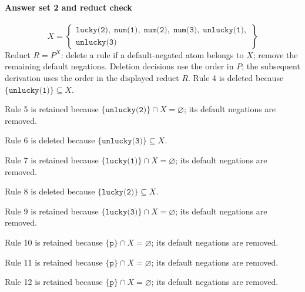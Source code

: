 \documentclass[a4paper,11pt]{article}
\newcommand{\at}[1]{\texttt{#1}}
\begin{document}
\paragraph{Answer set 2 and reduct check}
\[
X=\left\{\begin{gathered}\at{lucky(2)},\;\at{num(1)},\;\at{num(2)},\;\at{num(3)},\;\at{unlucky(1)},\\\at{unlucky(3)}\end{gathered}\right\}
\]
Reduct $R=P^X$: delete a rule if a default-negated atom belongs to $X$; remove the remaining default negations. Deletion decisions use the order in $P$; the subsequent derivation uses the order in the displayed reduct $R$.
Rule 4 is deleted because $\{\at{unlucky(1)}\}\subseteq X$.

Rule 5 is retained because $\{\at{unlucky(2)}\}\cap X=\varnothing$; its default negations are removed.

Rule 6 is deleted because $\{\at{unlucky(3)}\}\subseteq X$.

Rule 7 is retained because $\{\at{lucky(1)}\}\cap X=\varnothing$; its default negations are removed.

Rule 8 is deleted because $\{\at{lucky(2)}\}\subseteq X$.

Rule 9 is retained because $\{\at{lucky(3)}\}\cap X=\varnothing$; its default negations are removed.

Rule 10 is retained because $\{\at{p}\}\cap X=\varnothing$; its default negations are removed.

Rule 11 is retained because $\{\at{p}\}\cap X=\varnothing$; its default negations are removed.

Rule 12 is retained because $\{\at{p}\}\cap X=\varnothing$; its default negations are removed.
\end{document}
